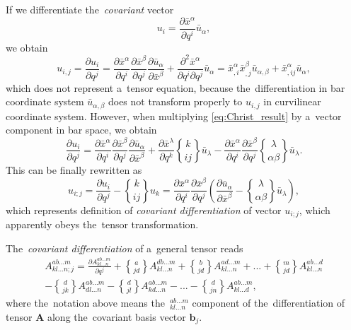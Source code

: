 \documentclass[review]{elsarticle}
\newcommand{\pdv}[2]{\frac{\partial{#1}}{\partial{#2}}}
\newcommand{\vect}[1]{\boldsymbol{#1}}
\newcommand{\matr}[1]{\mathbf{#1}}
\newcommand{\christ}[3]{\genfrac{\{}{\}}{0pt}{}{#1}{#2 #3}}
\begin{document}
If we differentiate the~\textit{covariant} vector
\begin{equation}
  u_i = \pdv{\bar{x}^\alpha}{q^i} \bar{u}_\alpha ,
  \nonumber
\end{equation}
we obtain
\begin{equation}
  u_{i,j} = \pdv{u_i}{q^j} = 
  \pdv{\bar{x}^\alpha}{q^i}\pdv{\bar{x}^\beta}{q^j}
  \pdv{\bar{u}_\alpha}{\bar{x}^\beta} 
  + \frac{\partial^2\bar{x}^\alpha}{\partial q^i\partial q^j} 
  \bar{u}_\alpha 
  = \bar{x}^\alpha_{,i}\bar{x}^\beta_{,j}
  \bar{u}_{\alpha,\beta} 
  + \bar{x}^\alpha_{,ij} 
  \bar{u}_\alpha ,
\end{equation}
which does not represent a~tensor equation, because the~differentiation
in bar coordinate system $\bar{u}_{\alpha,\beta}$ does not transform 
properly to $u_{i,j}$ in curvilinear coordinate system. However, when
multiplying \eqref{eq:Christ_result} by a~vector component in bar space,
we obtain
\begin{equation}
  \pdv{u_i}{q^j} = 
  \pdv{\bar{x}^\alpha}{q^i}\pdv{\bar{x}^\beta}{q^j}
  \pdv{\bar{u}_\alpha}{\bar{x}^\beta} 
  + \pdv{\bar{x}^\lambda}{q^k}\christ{k}{i}{j}\bar{u}_\lambda
  - \pdv{\bar{x}^\alpha}{q^i}\pdv{\bar{x}^\beta}{q^j}
  \christ{\lambda}{\alpha}{\beta}\bar{u}_\lambda .
  \nonumber
\end{equation}
This can be finally rewritten as
\begin{equation}
  u_{i;j} = \pdv{u_i}{q^j} 
  - \christ{k}{i}{j} u_k
  = \pdv{\bar{x}^\alpha}{q^i}\pdv{\bar{x}^\beta}{q^j}
  \left(\pdv{\bar{u}_\alpha}{\bar{x}^\beta} 
  - \christ{\lambda}{\alpha}{\beta}\bar{u}_\lambda\right) ,
  \label{eq:vector_covariant_diff}
\end{equation}
which represents definition of \textit{covariant differentiation} of vector
$u_{i;j}$, which apparently obeys the~tensor transformation.

The~\textit{covariant differentiation} of a~general tensor reads
\begin{multline}
  A^{ab...m}_{kl...n;j} = \pdv{A^{ab...m}_{kl...n}}{q^j} 
  + \christ{a}{j}{d}A^{db...m}_{kl...n}
  + \christ{b}{j}{d}A^{ad...m}_{kl...n} + ...
  + \christ{m}{j}{d}A^{ab...d}_{kl...n} \\
  - \christ{d}{j}{k}A^{ab...m}_{dl...n}
  - \christ{d}{j}{l}A^{ab...m}_{kd...n} - ...
  - \christ{d}{j}{n}A^{ab...m}_{kl...d} ,
\end{multline} 
where the~notation above means 
the~$^{ab...m}_{kl...n}$ component of the~differentiation of tensor 
$\matr{A}$ along the~covariant basis vector $\vect{b}_j$.
\end{document}

